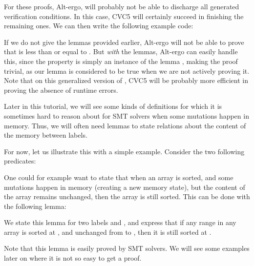 


For these proofs, Alt-ergo, will probably not be able to discharge all
generated verification conditions. In this case, CVC5 will certainly succeed
in finishing the remaining ones. We can then write the following example code:






If we do not give the lemmas provided earlier, Alt-ergo will not be able
to prove that  is less than or equal to
. But {\it with} the lemmas, Alt-ergo can easily handle this, since the
property is simply an instance of the lemma
, making the proof trivial, as our lemma is
considered to be true when we are not actively proving it. Note that on this
generalized version of , CVC5 will be probably more
efficient in proving the absence of runtime errors.




Later in this tutorial, we will see some kinds of definitions for which it is
sometimes hard to reason about for SMT solvers when some mutations happen in
memory. Thus, we will often need lemmas to state relations about the content
of the memory between labels.


For now, let us illustrate this with a simple example. Consider the two following
predicates:




One could for example want to state that when an array is sorted, and some
mutations happen in memory (creating a new memory state), but the content of the
array remains unchanged, then the array is still sorted. This can be done with
the following lemma:




We state this lemma for two labels  and , and
express that if any range in any array is sorted at , and
unchanged from  to , then it is still sorted at
.


Note that this lemma is easily proved by SMT solvers. We will see some
examples later on where it is not so easy to get a proof.




